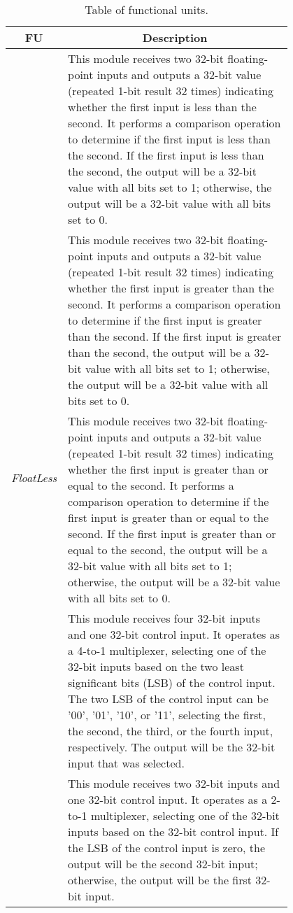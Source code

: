 \begin{table}[H]
    \centering
    \begin{tabular}{|c|p{0.8\linewidth}|}
        \hline
        \multicolumn{1}{|c|}{\textbf{FU}} & \multicolumn{1}{c|}{\textbf{Description}} \\
        \hline
        \multirow{6}{*}{\textit{FloatLess}} & This module receives two 32-bit floating-point inputs and outputs a 32-bit value (repeated 1-bit result 32 times) indicating whether the first input is less than the second. It performs a comparison operation to determine if the first input is less than the second. If the first input is less than the second, the output will be a 32-bit value with all bits set to 1; otherwise, the output will be a 32-bit value with all bits set to 0.  \\
        \hline
        \multirow{6}{*}{\textit{FloatGreater}} & This module receives two 32-bit floating-point inputs and outputs a 32-bit value (repeated 1-bit result 32 times) indicating whether the first input is greater than the second. It performs a comparison operation to determine if the first input is greater than the second. If the first input is greater than the second, the output will be a 32-bit value with all bits set to 1; otherwise, the output will be a 32-bit value with all bits set to 0. \\
        \hline
        \multirow{6}{*}{\textit{FloatGreaterEqual}} & This module receives two 32-bit floating-point inputs and outputs a 32-bit value (repeated 1-bit result 32 times) indicating whether the first input is greater than or equal to the second. It performs a comparison operation to determine if the first input is greater than or equal to the second. If the first input is greater than or equal to the second, the output will be a 32-bit value with all bits set to 1; otherwise, the output will be a 32-bit value with all bits set to 0. \\
        \hline
        \multirow{5}{*}{\textit{Mux4}} & This module receives four 32-bit inputs and one 32-bit control input. It operates as a 4-to-1 multiplexer, selecting one of the 32-bit inputs based on the two least significant bits (LSB) of the control input.  The two LSB of the control input can be '00', '01', '10', or '11', selecting the first, the second, the third, or the fourth input, respectively. The output will be the 32-bit input that was selected. \\
        \hline
        \multirow{4}{*}{\textit{Conditional1}} & This module receives two 32-bit inputs and one 32-bit control input. It operates as a 2-to-1 multiplexer, selecting one of the 32-bit inputs based on the 32-bit control input. If the LSB of the control input is zero, the output will be the second 32-bit input; otherwise, the output will be the first 32-bit input. \\
        \hline
    \end{tabular}
    \caption{Table of functional units.}
    \label{tab:fu}
\end{table}

